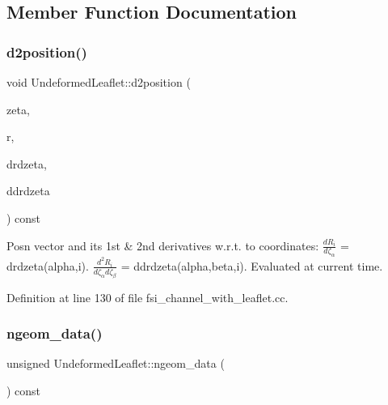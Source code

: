\subsection{Member Function Documentation}
\mbox{\label{classUndeformedLeaflet_a47d674756ce22e00a44ca0bd030a99da}} 
\subsubsection{\texorpdfstring{d2position()}{d2position()}}
{\footnotesize\ttfamily void Undeformed\+Leaflet\+::d2position (\begin{DoxyParamCaption}\item[{const Vector$<$ double $>$ \&}]{zeta,  }\item[{Vector$<$ double $>$ \&}]{r,  }\item[{Dense\+Matrix$<$ double $>$ \&}]{drdzeta,  }\item[{Rank\+Three\+Tensor$<$ double $>$ \&}]{ddrdzeta }\end{DoxyParamCaption}) const\hspace{0.3cm}{\ttfamily [inline]}}



Posn vector and its 1st \& 2nd derivatives w.\+r.\+t. to coordinates\+: $ \frac{dR_i}{d \zeta_\alpha}$ = drdzeta(alpha,i). $ \frac{d^2R_i}{d \zeta_\alpha d \zeta_\beta}$ = ddrdzeta(alpha,beta,i). Evaluated at current time. 



Definition at line 130 of file fsi\+\_\+channel\+\_\+with\+\_\+leaflet.\+cc.

\mbox{\label{classUndeformedLeaflet_a56153a1d117dd41657183655de094d3e}} 
\subsubsection{\texorpdfstring{ngeom\+\_\+data()}{ngeom\_data()}}
{\footnotesize\ttfamily unsigned Undeformed\+Leaflet\+::ngeom\+\_\+data (\begin{DoxyParamCaption}{ }\end{DoxyParamCaption}) const\hspace{0.3cm}{\ttfamily [inline]}}




